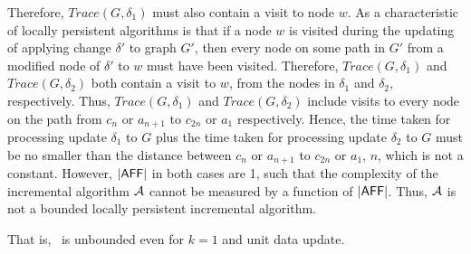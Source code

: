 Therefore, $Trace(G, \delta_1)$ must also contain a visit to node $w$.
As a characteristic of locally persistent algorithms is that if a node $w$ is visited during the updating of applying change $\delta'$ to graph $G'$,
then every node on some path in $G'$ from a modified node of $\delta'$ to $w$ must have been visited.
Therefore, $Trace(G, \delta_1)$ and $Trace(G, \delta_2)$ both contain a visit to $w$,
from the nodes in $\delta_1$ and $\delta_2$, respectively.
Thus, $Trace(G, \delta_1)$ and $Trace(G, \delta_2)$ include visits to every node on the path from $c_n$ or $a_{n+1}$ to $c_{2n}$ or $a_1$ respectively.
Hence, the time taken for processing update $\delta_1$ to $G$ plus the time taken for processing update $\delta_2$ to $G$ must be no smaller than the distance between $c_n$ or $a_{n+1}$ to $c_{2n}$ or $a_1$, \ie $n$, which is not a constant.
However, $|{\mathsf{AFF}}|$ in both cases are 1, such that the complexity of the incremental algorithm ${\cal A}$ cannot be measured by a function of $|{\mathsf{AFF}}|$.
Thus, ${\cal A}$ is not a bounded locally persistent incremental algorithm.

\vspace{-1.0ex}
That is, \dynteamF\, is unbounded even for $k=1$ and unit data update.


